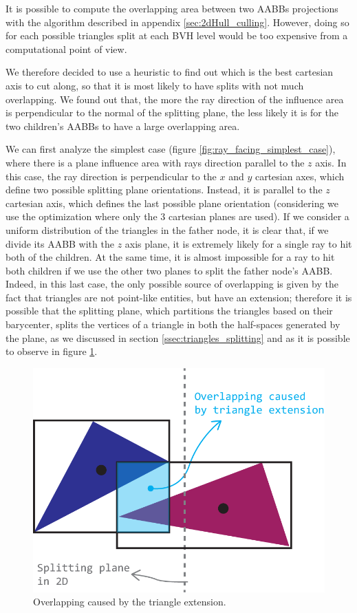 \documentclass{PoliMi_MasterThesis}
\begin{document}
It is possible to compute the overlapping area between two AABBs projections with the algorithm described in appendix \ref{sec:2dHull_culling}. However, doing so for each possible triangles split at each BVH level would be too expensive from a computational point of view.

We therefore decided to use a heuristic to find out which is the best cartesian axis to cut along, so that it is most likely to have splits with not much overlapping. We found out that, the more the ray direction of the influence area is perpendicular to the normal of the splitting plane, the less likely it is for the two children's AABBs to have a large overlapping area.

We can first analyze the simplest case (figure \ref{fig:ray_facing_simplest_case}), where there is a plane influence area with rays direction parallel to the $z$ axis. In this case, the ray direction is perpendicular to the $x$ and $y$ cartesian axes, which define two possible splitting plane orientations. Instead, it is parallel to the $z$ cartesian axis, which defines the last possible plane orientation (considering we use the optimization where only the 3 cartesian planes are used). If we consider a uniform distribution of the triangles in the father node, it is clear that, if we divide its AABB with the $z$ axis plane, it is extremely likely for a single ray to hit both of the children. At the same time, it is almost impossible for a ray to hit both children if we use the other two planes to split the father node's AABB. Indeed, in this last case, the only possible source of overlapping is given by the fact that triangles are not point-like entities, but have an extension; therefore it is possible that the splitting plane, which partitions the triangles based on their barycenter, splits the vertices of a triangle in both the half-spaces generated by the plane, as we discussed in section \ref{ssec:triangles_splitting} and as it is possible to observe in figure \ref{fig:triangle_splitting_extension}.

\begin{figure}[H]
	\centering
	\includegraphics[width=\textwidth*\real{0.45}]{Images/overlapping_by_extension.png}
	\caption{Overlapping caused by the triangle extension.}
	\label{fig:triangle_splitting_extension}
\end{figure}
\end{document}
